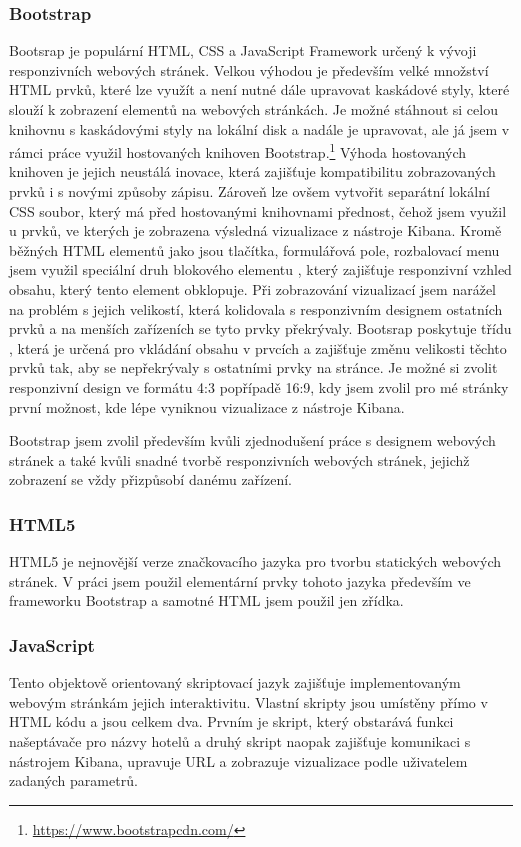 \documentclass[czech,BP]{thesiskiv}
\begin{document}
\subsubsection{Bootstrap}
Bootsrap je populární HTML, CSS a JavaScript Framework určený k vývoji responzivních webových stránek.\cite{Bootsrap} Velkou výhodou je především velké množství HTML prvků, které lze využít a není nutné dále upravovat kaskádové styly, které slouží k zobrazení elementů na webových stránkách. Je možné stáhnout si celou knihovnu s kaskádovými styly na lokální disk a nadále je upravovat, ale já jsem v rámci práce využil hostovaných knihoven Bootstrap.\footnote{\url{https://www.bootstrapcdn.com/}} Výhoda hostovaných knihoven je jejich neustálá inovace, která zajišťuje kompatibilitu zobrazovaných prvků i s novými způsoby zápisu. Zároveň lze ovšem vytvořit separátní lokální CSS soubor, který má před hostovanými knihovnami přednost, čehož jsem využil u prvků, ve kterých je zobrazena výsledná vizualizace z nástroje Kibana. Kromě běžných HTML elementů jako jsou tlačítka, formulářová pole, rozbalovací menu jsem využil speciální druh blokového elementu , který zajišťuje responzivní vzhled obsahu, který tento element obklopuje. Při zobrazování vizualizací jsem narážel na problém s jejich velikostí, která kolidovala s responzivním designem ostatních prvků a na menších zařízeních se tyto prvky překrývaly. Bootsrap poskytuje třídu , která je určená pro vkládání obsahu v prvcích  a zajišťuje změnu velikosti těchto prvků tak, aby se nepřekrývaly s ostatními prvky na stránce. Je možné si zvolit responzivní design ve formátu 4:3 popřípadě 16:9, kdy jsem zvolil pro mé stránky první možnost, kde lépe vyniknou vizualizace z nástroje Kibana.


Bootstrap jsem zvolil především kvůli zjednodušení práce s designem webových stránek a také kvůli snadné tvorbě responzivních webových stránek, jejichž zobrazení se vždy přizpůsobí danému zařízení.

\subsubsection{HTML5}
HTML5 je nejnovější verze značkovacího jazyka pro tvorbu statických webových stránek. V práci jsem použil elementární prvky tohoto jazyka především ve frameworku Bootstrap a samotné HTML jsem použil jen zřídka.

\subsubsection{JavaScript}
Tento objektově orientovaný skriptovací jazyk zajišťuje implementovaným webovým stránkám jejich interaktivitu. Vlastní skripty jsou umístěny přímo v HTML kódu a jsou celkem dva. Prvním je skript, který obstarává funkci našeptávače pro názvy hotelů a druhý skript naopak zajišťuje komunikaci s nástrojem Kibana, upravuje URL a zobrazuje vizualizace podle uživatelem zadaných parametrů. 
\end{document}
